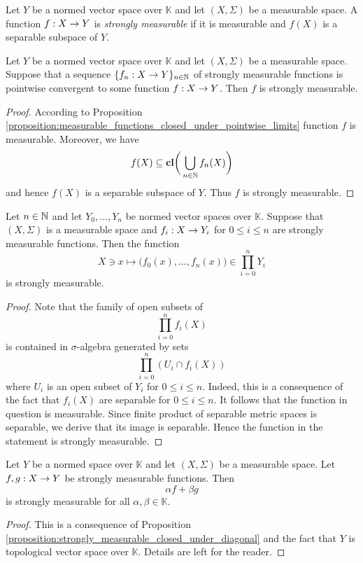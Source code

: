 \documentclass[10pt]{amsart}
\begin{document}
\begin{definition}
	Let $Y$ be a normed vector space over $\mathbb{K}$ and let $(X,\Sigma)$ be a measurable space. A function $f:X\rightarrow Y$ is \textit{strongly measurable} if it is measurable and $f(X)$ is a separable subspace of $Y$.
\end{definition}

\begin{proposition}\label{proposition:strongly_measurable_functions_closed_under_pointwise_limits}
	Let $Y$ be a normed vector space over $\mathbb{K}$ and let $(X,\Sigma)$ be a measurable space. Suppose that a sequence $\{f_n:X\rightarrow Y\}_{n\in {\mathbb N}}$ of strongly measurable functions is pointwise convergent to some function $f:X\rightarrow Y$. Then $f$ is strongly measurable.
\end{proposition}
\begin{proof}
	According to Proposition \ref{proposition:measurable_functions_closed_under_pointwise_limits} function $f$ is measurable. Moreover, we have
	$$f(X) \subseteq \mathbf{cl}\bigg(\bigcup_{n\in {\mathbb N}}f_n(X)\bigg)$$
	and hence $f(X)$ is a separable subspace of $Y$. Thus $f$ is strongly measurable.
\end{proof}

\begin{proposition}\label{proposition:strongly_measurable_closed_under_diagonal}
	Let $n\in {\mathbb N}$ and let $Y_0, ...,Y_n$ be normed vector spaces over $\mathbb{K}$. Suppose that $(X,\Sigma)$ is a measurable space and $f_i:X\rightarrow Y_i$ for $0 \leq i \leq n$ are strongly measurable functions. Then the function
	$$X\ni x \mapsto \bigg(f_0(x),...,f_n(x)\bigg) \in \prod_{i=0}^nY_i$$
	is strongly measurable.
\end{proposition}
\begin{proof}
	Note that the family of open subsets of
	$$\prod_{i=0}^nf_i(X)$$
	is contained in $\sigma$-algebra generated by sets
	$$\prod_{i=0}^n\left(U_i\cap f_i(X)\right)$$
	where $U_i$ is an open subset of $Y_i$ for $0\leq i \leq n$. Indeed, this is a consequence of the fact that $f_i(X)$ are separable for $0\leq i\leq n$. It follows that the function in question is measurable. Since finite product of separable metric spaces is separable, we derive that its image is separable. Hence the function in the statement is strongly measurable.
\end{proof}

\begin{corollary}\label{corollary:strongly_measurable_form_vector_space}
	Let $Y$ be a normed space over $\mathbb{K}$ and let $(X,\Sigma)$ be a measurable space. Let $f, g:X\rightarrow Y$ be strongly measurable functions. Then
	$$\alpha f + \beta g$$
	is strongly measurable for all $\alpha,\beta \in \mathbb{K}$.
\end{corollary}
\begin{proof}
	This is a consequence of Proposition \ref{proposition:strongly_measurable_closed_under_diagonal} and the fact that $Y$ is topological vector space over $\mathbb{K}$. Details are left for the reader.
\end{proof}
\end{document}
